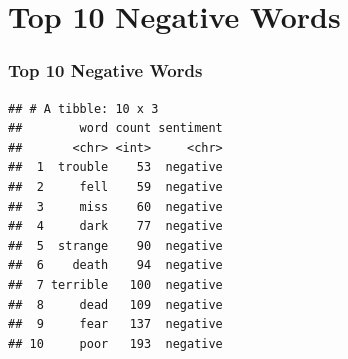 \documentclass{beamer}\usepackage[]{graphicx}\usepackage[]{color}
\makeatletter
\newenvironment{kframe}{%
 \def\at@end@of@kframe{}%
 \ifinner\ifhmode%
  \def\at@end@of@kframe{\end{minipage}}%
  \begin{minipage}{\columnwidth}%
 \fi\fi%
 \def\FrameCommand##1{\hskip\@totalleftmargin \hskip-\fboxsep
 \colorbox{shadecolor}{##1}\hskip-\fboxsep
     \hskip-\linewidth \hskip-\@totalleftmargin \hskip\columnwidth}%
 \MakeFramed {\advance\hsize-\width
   \@totalleftmargin\z@ \linewidth\hsize
   \@setminipage}}%
 {\par\unskip\endMakeFramed%
 \at@end@of@kframe}
\newenvironment{knitrout}{}{} %
\makeatother
\begin{document}
\section{Top 10 Negative Words}
\begin{frame}[fragile]
  \frametitle{Top 10 Negative Words}
\begin{knitrout}
\color{fgcolor}\begin{kframe}
\begin{verbatim}
## # A tibble: 10 x 3
##        word count sentiment
##       <chr> <int>     <chr>
##  1  trouble    53  negative
##  2     fell    59  negative
##  3     miss    60  negative
##  4     dark    77  negative
##  5  strange    90  negative
##  6    death    94  negative
##  7 terrible   100  negative
##  8     dead   109  negative
##  9     fear   137  negative
## 10     poor   193  negative
\end{verbatim}
\end{kframe}
\end{knitrout}
\end{frame}
\end{document}

